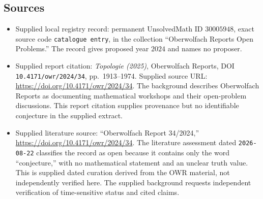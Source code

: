\documentclass[11pt]{article}
\begin{document}
\subsection{Sources}
\begin{itemize}
\item Supplied local registry record: permanent UnsolvedMath ID \(30005948\), exact source code \texttt{catalogue entry}, in the collection ``Oberwolfach Reports Open Problems.'' The record gives proposed year \(2024\) and names no proposer.
\item Supplied report citation: \emph{Topologie (2025)}, Oberwolfach Reports, DOI \texttt{10.4171/owr/2024/34}, pp.\ 1913--1974. Supplied source URL: \url{https://doi.org/10.4171/owr/2024/34}. The background describes Oberwolfach Reports as documenting mathematical workshops and their open-problem discussions. This report citation supplies provenance but no identifiable conjecture in the supplied extract.
\item Supplied literature source: ``Oberwolfach Report 34/2024,'' \url{https://doi.org/10.4171/owr/2024/34}. The literature assessment dated \texttt{2026-08-22} classifies the record as open because it contains only the word ``conjecture,'' with no mathematical statement and an unclear truth value. This is supplied dated curation derived from the OWR material, not independently verified here. The supplied background requests independent verification of time-sensitive status and cited claims.
\end{itemize}
\end{document}

